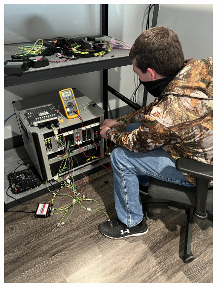 \documentclass{beamer}
\begin{document}
\begin{frame}
	\begin{figure}
		\centering	
		\begin{minipage}{.5\textwidth}
	  		\centering
	  		\includegraphics[angle=270,width=.85\linewidth]{figs/img/picturesVisitToAStuff/aStuffVisit2Nick}
	  		\label{fig:test1}
		\end{minipage}%
		\begin{minipage}{.5\textwidth}
	  		\centering

\end{minipage}
\end{figure}
\end{frame}
\end{document}
